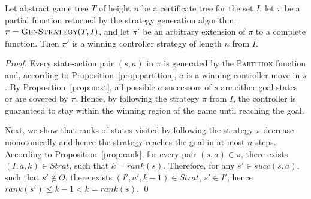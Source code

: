 \begin{theorem}
Let abstract game tree $T$ of height $n$ be a certificate tree for
the set $I$, let $\pi$ be a partial function returned by the
strategy generation algorithm, $\pi=\textsc{GenStrategy}(T,I)$,
and let $\pi'$ be an arbitrary extension of $\pi$ to a complete
function.  Then $\pi'$ is a winning controller strategy of length
$n$ from $I$.
\end{theorem}
\begin{proof}
Every state-action pair $(s, a)$ in $\pi$ is generated by the
\textsc{Partition} function and, according to
Proposition~\ref{prop:partition}, $a$ is a winning controller move
in $s$. By Proposition~\ref{prop:next}, all possible
$a$-successors of $s$ are either goal states or are covered by
$\pi$.  Hence, by following the strategy $\pi$ from $I$, the
controller is guaranteed to stay within the winning region of the
game until reaching the goal.

Next, we show that ranks of states visited by following the
strategy $\pi$ decrease monotonically and hence the strategy
reaches the goal in at most $n$ steps. According to
Proposition~\ref{prop:rank}, for every pair $(s,a) \in \pi$, there
exists $(I, a, k)\in Strat$, such that $k=rank(s)$.  Therefore,
for any $s'\in succ(s,a)$, such that $s'\not\in O$, there exists
$(I', a', k-1)\in Strat$, $s'\in I'$; hence $rank(s')\leq k-1 < k
= rank(s)$.
\qed
\end{proof}

